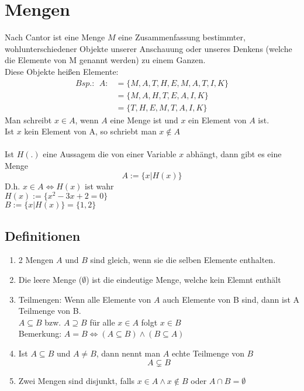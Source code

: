 \documentclass{article}
\begin{document}
    \section{Mengen}
        Nach Cantor ist eine Menge $M$ eine Zusammenfassung bestimmter, wohlunterschiedener Objekte unserer Anschauung oder unseres Denkens (welche die Elemente von M genannt werden) zu einem Ganzen.\\
        Diese Objekte heißen Elemente:
        \begin{align*}
            Bsp.: \:\:A:&=\{M,A,T,H,E,M,A,T,I,K\}\\
            \,&=\{M,A,H,T,E,A,I,K\}\\
            \,&=\{T,H,E,M,T,A,I,K\}
        \end{align*}
        Man schreibt $x\in A $, wenn $A$ eine Menge ist und $x$ ein Element von $A$ ist.\\
        Ist $x$ kein Element von A, so schriebt man $x\notin A$\\\\
        Ist $H(.)$ eine Aussagem die von einer Variable $x$ abhängt, dann gibt es eine Menge 
        $$A:=\{x|H(x)\}$$
        D.h. $x\in A\iff H(x)$ ist wahr\\

        $H(x):=\{x^2-3x+2=0\}$\\
        $B:=\{x|H(x)\}=\{1,2\}$\\
        \subsection*{Definitionen}
            \begin{enumerate}
                \item 2 Mengen $A$ und $B$ sind gleich, wenn sie die selben Elemente enthalten.
                \item Die leere Menge ($\emptyset$) ist die eindeutige Menge, welche kein Elemnt enthält
                \item Teilmengen: Wenn alle Elemente von $A$ auch Elemente von B sind, dann ist A Teilmenge von B.\\
                $A\subseteq B$ bzw. $A\supseteq B$ für alle $x\in A$ folgt $x\in B$\\
                Bemerkung: $A=B\iff (A\subseteq B)\land (B\subseteq A)$
                \item Ist $A\subseteq B $ und $ A\neq B$, dann nennt man $A$ echte Teilmenge von $B$ $$A\subsetneq B$$
                \item Zwei Mengen sind disjunkt, falls $x\in A\land x\notin B$ oder $A \cap B = \emptyset$  
            \end{enumerate}
\end{document}
